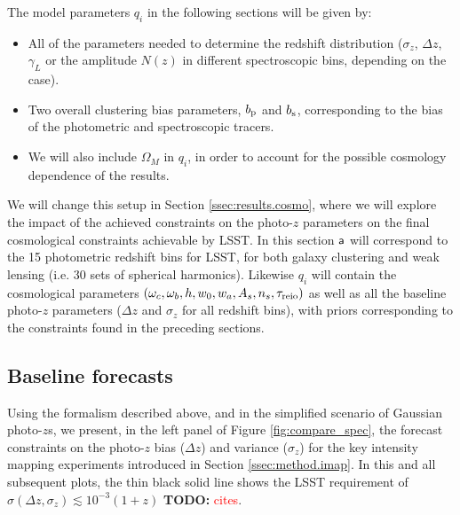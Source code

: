\documentclass[prd,twocolumn]{revtex4}
\newcommand{\TODO}[1]{{\bf TODO:} \textcolor{red}{#1}}
\begin{document}
  The model parameters $q_i$ in the following sections will be given by:
  \begin{itemize}
    \item All of the parameters needed to determine the redshift distribution
          ($\sigma_z$, $\Delta z$, $\gamma_L$ or the amplitude $N(z)$ in different
          spectroscopic bins, depending on the case).
    \item Two overall clustering bias parameters, $b_{\rm p}$ and $b_{\rm s}$,
          corresponding to the bias of the photometric and spectroscopic tracers.
    \item We will also include $\Omega_M$ in $q_i$, in order to account for the
          possible cosmology dependence of the results.
  \end{itemize}
  
  We will change this setup in Section \ref{ssec:results.cosmo}, where we will
  explore the impact of the achieved constraints on the photo-$z$ parameters on
  the final cosmological constraints achievable by LSST. In this section
  ${\sf a}$ will correspond to the 15 photometric redshift bins for LSST, for
  both galaxy clustering and weak lensing (i.e. 30 sets of spherical harmonics).
  Likewise $q_i$ will contain the cosmological parameters
  $(\omega_c,\omega_b,h,w_0,w_a,A_s,n_s,\tau_{\rm reio})$ as well as all the
  baseline photo-$z$ parameters ($\Delta z$ and $\sigma_z$ for all redshift
  bins), with priors corresponding to the constraints found in the preceding
  sections.

  \subsection{Baseline forecasts} \label{ssec:results.baseline}
    Using the formalism described above, and in the simplified scenario of Gaussian photo-$z$s,
    we present, in the left panel of Figure \ref{fig:compare_spec}, the forecast constraints on the 
    photo-$z$ bias ($\Delta z$) and variance ($\sigma_z$) for the key intensity mapping experiments
    introduced in Section \ref{ssec:method.imap}. In this and all subsequent plots, the thin black
    solid line shows the LSST requirement of $\sigma(\Delta z,\sigma_z)\lesssim10^{-3}(1+z)$
    \TODO{cites}.
    
\end{document}
